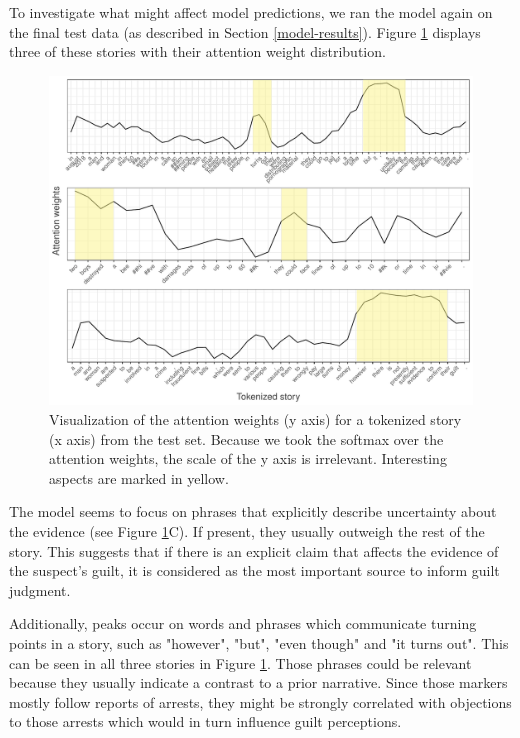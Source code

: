 \documentclass[11pt,a4paper]{article}
\begin{document}
To investigate what might affect model predictions, we ran the model again on the final test data (as described in Section \ref{model-results}). Figure \ref{fig:viz} displays three of these stories with their attention weight distribution.

\begin{figure}
	\includegraphics[width=\linewidth]{graphs/attention-viz-marked2.pdf}
	\caption{Visualization of the attention weights (y axis) for a tokenized story (x axis) from the test set. Because we took the softmax over the attention weights, the scale of the y axis is irrelevant. Interesting aspects are marked in yellow.}
	\label{fig:viz}
\end{figure}

The model seems to focus on phrases that explicitly describe uncertainty about the evidence (see Figure \ref{fig:viz}C). If present, they usually outweigh the rest of the story. This suggests that if there is an explicit claim that affects the evidence of the suspect's guilt, it is considered as the most important source to inform guilt judgment.

Additionally, peaks occur on words and phrases which communicate turning points in a story, such as "however", "but", "even though" and "it turns out". This can be seen in all three stories in Figure \ref{fig:viz}. Those phrases could be relevant because they usually indicate a contrast to a prior narrative. Since those markers mostly follow reports of arrests, they might be strongly correlated with objections to those arrests which would in turn influence guilt perceptions.
\end{document}

